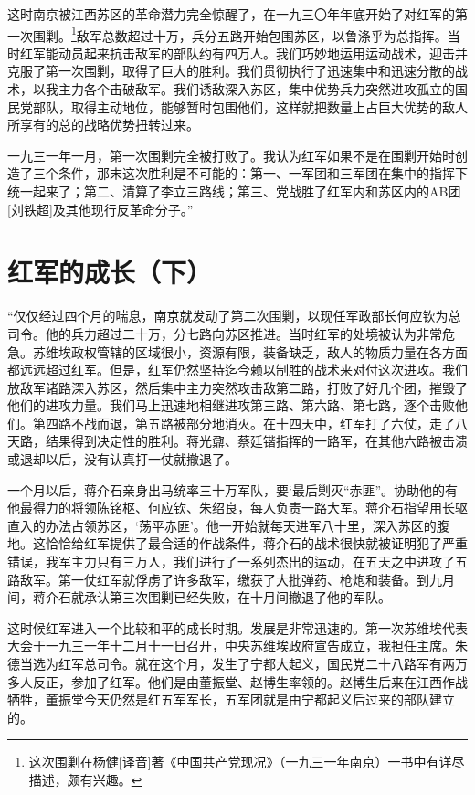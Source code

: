 \documentclass[10pt]{book}
\begin{document}
这时南京被江西苏区的革命潜力完全惊醒了，在一九三〇年年底开始了对红军的第一次围剿。\footnote{这次围剿在杨健[译音]著《中国共产党现况》（一九三一年南京）一书中有详尽描述，颇有兴趣。}敌军总数超过十万，兵分五路开始包围苏区，以鲁涤乎为总指挥。当时红军能动员起来抗击敌军的部队约有四万人。我们巧妙地运用运动战术，迎击并克服了第一次围剿，取得了巨大的胜利。我们贯彻执行了迅速集中和迅速分散的战术，以我主力各个击破敌军。我们诱敌深入苏区，集中优势兵力突然进攻孤立的国民党部队，取得主动地位，能够暂时包围他们，这样就把数量上占巨大优势的敌人所享有的总的战略优势扭转过来。

一九三一年一月，第一次围剿完全被打败了。我认为红军如果不是在围剿开始时创造了三个条件，那末这次胜利是不可能的：第一、一军团和三军团在集中的指挥下统一起来了；第二、清算了李立三路线；第三、党战胜了红军内和苏区内的AB团[刘铁超]及其他现行反革命分子。”



\section{红军的成长（下）}

“仅仅经过四个月的喘息，南京就发动了第二次围剿，以现任军政部长何应钦为总司令。他的兵力超过二十万，分七路向苏区推进。当时红军的处境被认为非常危急。苏维埃政权管辖的区域很小，资源有限，装备缺乏，敌人的物质力量在各方面都远远超过红军。但是，红军仍然坚持迄今赖以制胜的战术来对付这次进攻。我们放敌军诸路深入苏区，然后集中主力突然攻击敌第二路，打败了好几个团，摧毁了他们的进攻力量。我们马上迅速地相继进攻第三路、第六路、第七路，逐个击败他们。第四路不战而退，第五路被部分地消灭。在十四天中，红军打了六仗，走了八天路，结果得到决定性的胜利。蒋光鼐、蔡廷锴指挥的一路军，在其他六路被击溃或退却以后，没有认真打一仗就撤退了。

一个月以后，蒋介石亲身出马统率三十万军队，要‘最后剿灭“赤匪”。协助他的有他最得力的将领陈铭枢、何应钦、朱绍良，每人负责一路大军。蒋介石指望用长驱直入的办法占领苏区，‘荡平赤匪’。他一开始就每天进军八十里，深入苏区的腹地。这恰恰给红军提供了最合适的作战条件，蒋介石的战术很快就被证明犯了严重错误，我军主力只有三万人，我们进行了一系列杰出的运动，在五天之中进攻了五路敌军。第一仗红军就俘虏了许多敌军，缴获了大批弹药、枪炮和装备。到九月间，蒋介石就承认第三次围剿已经失败，在十月间撤退了他的军队。

这时候红军进入一个比较和平的成长时期。发展是非常迅速的。第一次苏维埃代表大会于一九三一年十二月十一日召开，中央苏维埃政府宣告成立，我担任主席。朱德当选为红军总司令。就在这个月，发生了宁都大起义，国民党二十八路军有两万多人反正，参加了红军。他们是由董振堂、赵博生率领的。赵博生后来在江西作战牺牲，董振堂今天仍然是红五军军长，五军团就是由宁都起义后过来的部队建立的。
\end{document}
